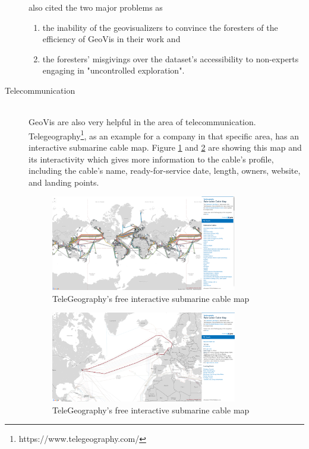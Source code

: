\begin{description}
\citeauthor{Andrienko2007} also cited the two major problems as
\begin{enumerate}
\item the inability of the geovisualizers to convince the foresters of the efficiency of \ac{GeoVis} in their work and
\item the foresters' misgivings over the dataset's accessibility to non-experts engaging in "uncontrolled exploration".
\end{enumerate}

\item[Telecommunication] \hfill \\
\ac{GeoVis} are also very helpful in the area of telecommunication. Telegeography\footnote{https://www.telegeography.com/}, as an example for a company in that specific area, has an interactive submarine cable map. Figure \ref{fig:submarine} and \ref{fig:submarine-interactive} are showing this map and its interactivity which gives more information to the cable’s profile, including the cable’s name, ready-for-service date, length, owners, website, and landing points.

\begin{figure}[h]
\centering
\includegraphics[width=0.8\textwidth,keepaspectratio]{images/geovis/submarine.png}
\caption[
    TeleGeography’s free interactive submarine cable map, Urldate: 07.2016 \newline
\small\texttt{\url{http://www.submarinecablemap.com/}}
]{TeleGeography’s free interactive submarine cable map}
\label{fig:submarine}
\end{figure}

\begin{figure}[h]
\centering
\includegraphics[width=0.8\textwidth,keepaspectratio]{images/geovis/submarine-interactive.png}
\caption[
    TeleGeography’s free interactive submarine cable map, Urldate: 07.2016 \newline
\small\texttt{\url{http://www.submarinecablemap.com/}}
]{TeleGeography’s free interactive submarine cable map}
\label{fig:submarine-interactive}
\end{figure}


\end{description}
